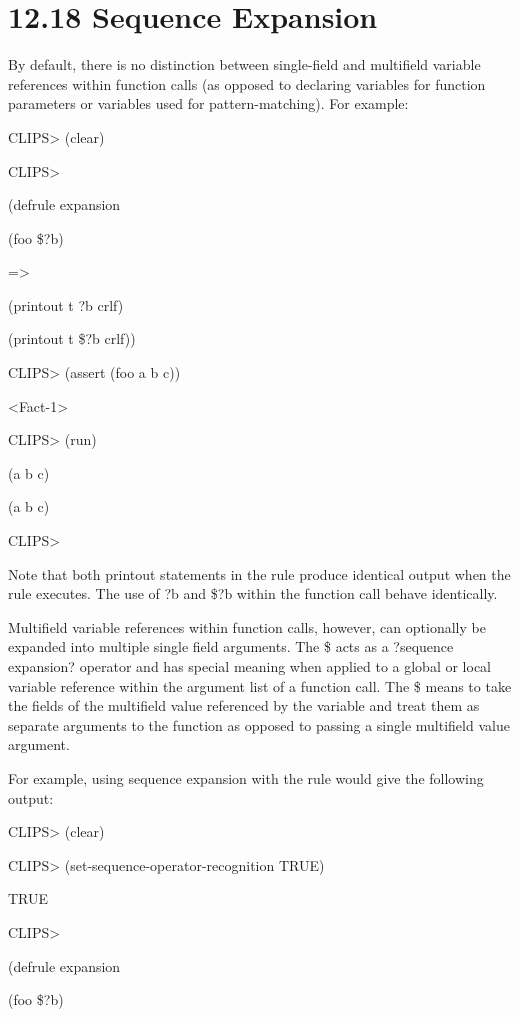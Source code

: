 \documentclass[letterpaper,10pt,english]{sphinxmanual}
\begin{document}
\section{12.18 Sequence Expansion}
\label{\detokenize{actions:sequence-expansion}}
By default, there is no distinction between single-field and multifield
variable references within function calls (as opposed to declaring
variables for function parameters or variables used for
pattern-matching). For example:

CLIPS\textgreater{} (clear)

CLIPS\textgreater{}

(defrule expansion

(foo \$?b)

=\textgreater{}

(printout t ?b crlf)

(printout t \$?b crlf))

CLIPS\textgreater{} (assert (foo a b c))

\textless{}Fact-1\textgreater{}

CLIPS\textgreater{} (run)

(a b c)

(a b c)

CLIPS\textgreater{}

Note that both printout statements in the rule produce identical output
when the rule executes. The use of ?b and \$?b within the function call
behave identically.

Multifield variable references within function calls, however, can
optionally be expanded into multiple single field arguments. The \$ acts
as a ?sequence expansion? operator and has special meaning when applied
to a global or local variable reference within the argument list of a
function call. The \$ means to take the fields of the multifield value
referenced by the variable and treat them as separate arguments to the
function as opposed to passing a single multifield value argument.

For example, using sequence expansion with the  rule would
give the following output:

CLIPS\textgreater{} (clear)

CLIPS\textgreater{} (set-sequence-operator-recognition TRUE)

TRUE

CLIPS\textgreater{}

(defrule expansion

(foo \$?b)
\end{document}

